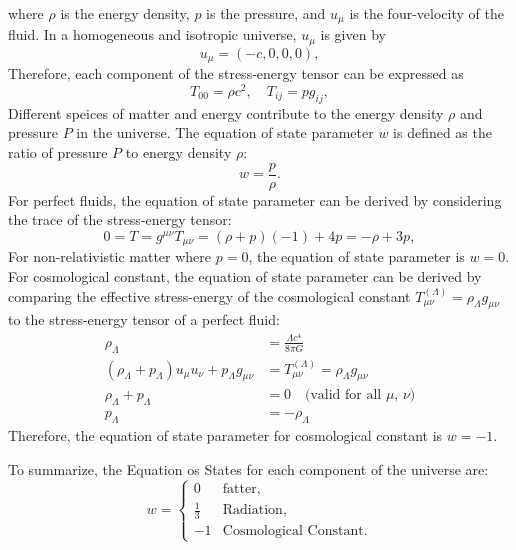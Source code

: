 where \( \rho \) is the energy density, \( p \) is the pressure, and \( u_{\mu} \) is the four-velocity of the fluid.
In a homogeneous and isotropic universe, \( u_{\mu} \) is given by
\begin{equation}
    u_{\mu} = (-c, 0, 0, 0),
    \label{eq:four_velocity}
\end{equation}
Therefore, each component of the stress-energy tensor can be expressed as
\begin{equation}
    T_{00} = \rho c^2, \quad T_{ij} = p g_{ij},
    \label{eq:stress_energy_components}
\end{equation}
Different speices of matter and energy contribute to the energy density \( \rho \) and pressure \( P \) in the universe. The equation of state parameter \( w \) is defined as the ratio of pressure \( P \) to energy density \( \rho \):
\begin{equation}
    w = \frac{p}{\rho}.
    \label{eq:equation_of_state}
\end{equation}
For perfect fluids, the equation of state parameter can be derived by considering the trace of the stress-energy tensor:
\begin{equation}
    0 = T = g^{\mu\nu} T_{\mu\nu} = (\rho + p)(-1) + 4p = -\rho + 3p,
    \label{eq:stress_energy_trace}
\end{equation}
For non-relativistic matter where $p = 0$, the equation of state parameter is \( w = 0 \). 
For cosmological constant, the equation of state parameter can be derived by comparing the effective stress-energy of the cosmological constant $T_{\mu\nu}^{(\Lambda)} = \rho_{\Lambda} g_{\mu\nu}$ to the stress-energy tensor of a perfect fluid:
\begin{align}
    \rho_{\Lambda} &= \frac{\Lambda c^4}{8\pi G} \label{eq:lambda_density} \\
    \left(\rho_{\Lambda} + p_{\Lambda} \right) u_{\mu} u_{\nu} + p_{\Lambda} g_{\mu\nu} &= T_{\mu\nu}^{(\Lambda)} = \rho_{\Lambda} g_{\mu\nu}  \\
    \rho_{\Lambda} + p_{\Lambda} &= 0 \quad \text{(valid for all $\mu$, $\nu$)} \nonumber \\
    p_{\Lambda} &= -\rho_{\Lambda} \label{eq:lambda_pressure}
\end{align}
Therefore, the equation of state parameter for cosmological constant is \( w = -1 \).

To summarize, the Equation os States for each component of the universe are:
\begin{equation}
    w = 
    \begin{cases}
        0 & \text{fatter}, \\
        \frac{1}{3} & \text{Radiation}, \\
        -1 & \text{Cosmological Constant}.
    \end{cases}
    \label{eq:equation_of_state_summary}
\end{equation}

